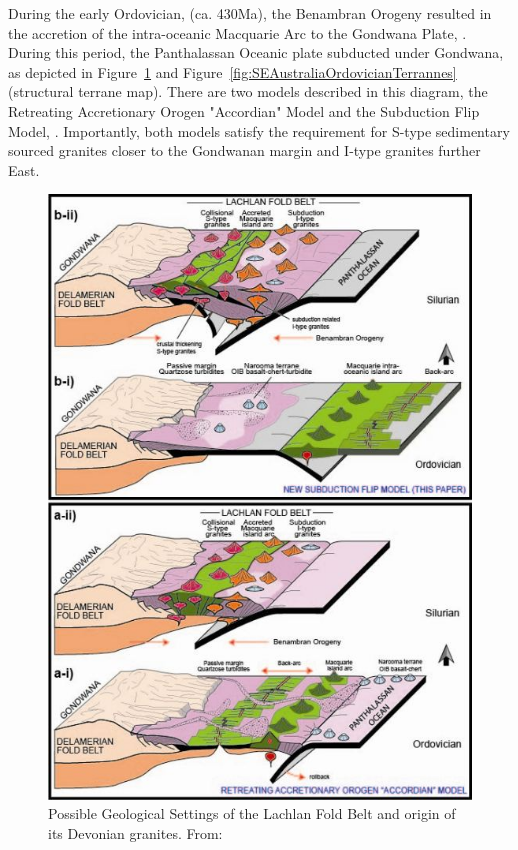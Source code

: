 \documentclass[a4paper]{article}
\begin{document}
During the early Ordovician, (ca. 430Ma), the Benambran Orogeny resulted in the accretion of the intra-oceanic Macquarie Arc to the Gondwana Plate, \cite{BenambranOrogeny}.  During this period, the Panthalassan Oceanic plate subducted under Gondwana, as depicted in Figure~\ref{fig:GraniteModels} and Figure~\ref{fig:SEAustraliaOrdovicianTerrannes} (structural  terrane map). There are two models described in this diagram, the Retreating Accretionary Orogen "Accordian" Model and the Subduction Flip Model, \cite{aitchison2012accordion}. Importantly, both models satisfy the requirement for S-type sedimentary sourced granites closer to the Gondwanan margin and I-type granites further East.

\begin{figure}[H]
\centering
\includegraphics[width=1\textwidth]{granite_models.jpg}
\caption{\label{fig:GraniteModels} Possible Geological Settings of the Lachlan Fold Belt and origin of its Devonian granites. From: \cite{aitchison2012accordion}}
\end{figure}
\end{document}
